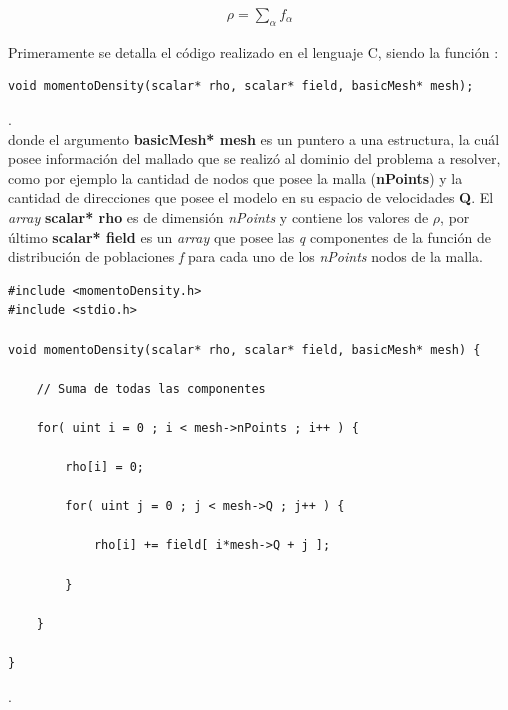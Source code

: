 \begin{align*}
	\rho = \sum_{\alpha} f_{\alpha}
\end{align*}

\newpage

Primeramente se detalla el código realizado en el lenguaje \textsc{C}, siendo la función :

{\footnotesize
	\begin{frame}{}
		\begin{lstlisting}
void momentoDensity(scalar* rho, scalar* field, basicMesh* mesh);
		\end{lstlisting}
		
	\end{frame}
}.
\\
donde el argumento \textbf{basicMesh* mesh} es un puntero a una estructura, la cuál posee información del mallado que se realizó al dominio del problema a resolver, como por ejemplo la cantidad de nodos que posee la malla (\textbf{nPoints}) y la cantidad de direcciones que posee el modelo en su espacio de velocidades \textbf{Q}. El \textit{array}  \textbf{scalar* rho} es de dimensión \textit{nPoints} y contiene los valores de $\rho$, por último \textbf{scalar* field} es un \textit{array} que posee las \textit{q} componentes de la función de distribución de poblaciones \textit{f} para cada uno de los  \textit{nPoints} nodos de la malla.


{\footnotesize
	\begin{frame}{}
		\begin{lstlisting}[frame=single]
#include <momentoDensity.h>
#include <stdio.h>

void momentoDensity(scalar* rho, scalar* field, basicMesh* mesh) {
	
	// Suma de todas las componentes
	
	for( uint i = 0 ; i < mesh->nPoints ; i++ ) {
		
		rho[i] = 0;	    
		
		for( uint j = 0 ; j < mesh->Q ; j++ ) {
		
			rho[i] += field[ i*mesh->Q + j ];
		
		}	
			
	}
	
}
		\end{lstlisting}
		
	\end{frame}
}.
\\

